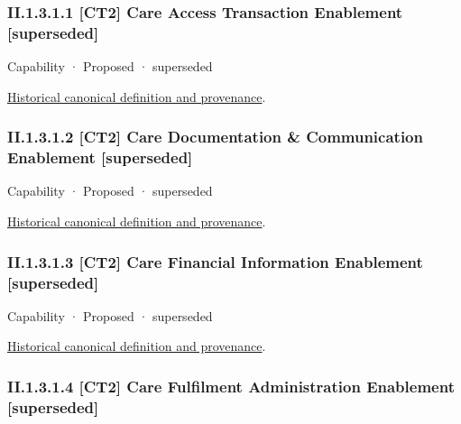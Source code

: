 \subsubsection*{II.1.3.1.1 [CT2] Care Access Transaction Enablement [superseded]}
\label{navigation:II.1.3.1.1}

\label{element:b65973b576154d3a96cf458bf33df53a}
{\small Capability · Proposed · superseded}\par
\href{../../../../../../../continuum/strategy/capability/b65973b576154d3a96cf458bf33df53a.md}{Historical canonical definition and provenance}.\par
\subsubsection*{II.1.3.1.2 [CT2] Care Documentation \& Communication Enablement [superseded]}
\label{navigation:II.1.3.1.2}

\label{element:5ad2e381ec484d1d9062a65eee842fa7}
{\small Capability · Proposed · superseded}\par
\href{../../../../../../../continuum/strategy/capability/5ad2e381ec484d1d9062a65eee842fa7.md}{Historical canonical definition and provenance}.\par
\subsubsection*{II.1.3.1.3 [CT2] Care Financial Information Enablement [superseded]}
\label{navigation:II.1.3.1.3}

\label{element:59a756b89c604e3e97ee5dede2d6ed89}
{\small Capability · Proposed · superseded}\par
\href{../../../../../../../continuum/strategy/capability/59a756b89c604e3e97ee5dede2d6ed89.md}{Historical canonical definition and provenance}.\par
\subsubsection*{II.1.3.1.4 [CT2] Care Fulfilment Administration Enablement [superseded]}
\label{navigation:II.1.3.1.4}

